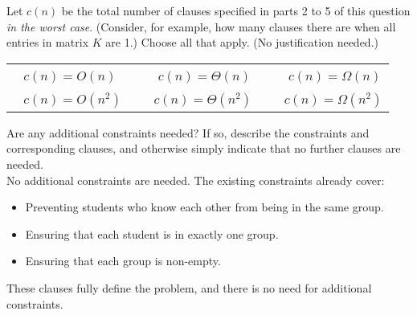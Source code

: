 \documentclass[11pt,fleqn]{exam}
\newcommand{\fillinMCmath}[1]{\begin{tikzpicture}\draw circle [radius=0.5em];\end{tikzpicture}\ #1}
\newcommand{\fillinMCmathsoln}[1]{\begin{tikzpicture}\draw[black, fill=blue] circle [radius=0.5em];\end{tikzpicture}\ #1}
\newif\ifsolutions\solutionsfalse
\newenvironment{soln}{\color{solnblue}}{}
\begin{document}
\begin{questions}
  \question[2]
  Let $c(n)$ be the total number of clauses specified in parts 2 to 5 of this question {\em in the worst case}. (Consider, for example, how many clauses there are when all entries in matrix $K$ are 1.) Choose all that apply. (No justification needed.)

  \vspace{.1in}

  \ifsolutions
    
  \else
    \begin{tabular}{lllll}
      \hspace{.5in} \fillinMCmath{} $c(n) = O(n)$   & \hspace{.5in} & \fillinMCmath{} $c(n) = \Theta(n)$      & \hspace{.5in} & \fillinMCmath{} $c(n) = \Omega(n)$  \\

      \hspace{.5in} \fillinMCmath{} $c(n) = O(n^2)$ & \hspace{.5in} & \fillinMCmathsoln{}$c(n) = \Theta(n^2)$ & \hspace{.5in} & \fillinMCmath{}$c(n) = \Omega(n^2)$
    \end{tabular}
  \fi
  \vspace{.1in}

  \question[2]
  Are any additional constraints needed? If so, describe the constraints and corresponding clauses, and otherwise simply indicate that no further clauses are needed. \\
  \begin{soln}
    No additional constraints are needed. The existing constraints already cover:
\begin{itemize}
    \item Preventing students who know each other from being in the same group.
    \item Ensuring that each student is in exactly one group.
    \item Ensuring that each group is non-empty.
\end{itemize}
These clauses fully define the problem, and there is no need for additional constraints.

  \end{soln}


\end{questions}
\end{document}
